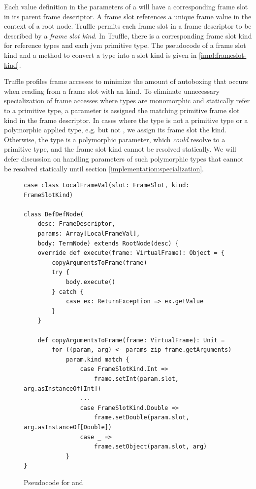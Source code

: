 Each value definition in the parameters of a  will have a corresponding frame slot in its parent frame descriptor. 
A frame slot references a unique frame value in the context of a root node.
Truffle permits each frame slot in a frame descriptor to be described by a \textit{frame slot kind}.
In Truffle, there is a corresponding frame slot kind for reference types and each \acrshort{jvm} primitive type. 
The pseudocode of a frame slot kind and a method to convert a type into a slot kind is given in \ref{impl:frameslot-kind}.

Truffle profiles frame accesses to minimize the amount of autoboxing that occurs when reading from a frame slot with an  kind. 
To eliminate unnecessary specialization of frame accesses where types are monomorphic and statically refer to a primitive type, a parameter is assigned the matching primitive frame slot kind in the frame descriptor. 
In cases where the type is not a primitive type or a polymorphic applied type, e.g.  but not , we assign its frame slot the  kind.
Otherwise, the type is a polymorphic parameter, which \textit{could} resolve to a primitive type, and the frame slot kind cannot be resolved statically.
We will defer discussion on handling parameters of such polymorphic types that cannot be resolved statically until section \ref{implementation:specialization}.

\begin{figure}[!htb]
\begin{verbatim}
case class LocalFrameVal(slot: FrameSlot, kind: FrameSlotKind)
	
class DefDefNode(
	desc: FrameDescriptor, 
	params: Array[LocalFrameVal], 
	body: TermNode) extends RootNode(desc) {
	override def execute(frame: VirtualFrame): Object = {
		copyArgumentsToFrame(frame)
		try {
			body.execute()
		} catch {
			case ex: ReturnException => ex.getValue
		}
	}	
		
	def copyArgumentsToFrame(frame: VirtualFrame): Unit = 
		for ((param, arg) <- params zip frame.getArguments) 
			param.kind match {
				case FrameSlotKind.Int =>
					frame.setInt(param.slot, arg.asInstanceOf[Int])
				...
				case FrameSlotKind.Double =>
					frame.setDouble(param.slot, arg.asInstanceOf[Double])	
				case _ =>
					frame.setObject(param.slot, arg)
			}
}
\end{verbatim}
\caption{Pseudocode for  and }
\label{impl:defdefnode}
\end{figure}

